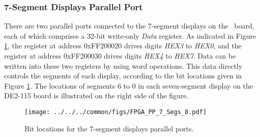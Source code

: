 \subsubsection{7-Segment Displays Parallel Port}

There are two parallel ports connected to the 7-segment displays on the \DEBoard~board, each of
which comprises a 32-bit write-only {\it Data} register. As indicated in 
Figure \ref{fig:segment_port}, the register at address {\sf 0xFF200020} 
drives digits {\it HEX3} to {\it HEX0}, and the register at 
address {\sf 0xFF200030} drives digits {\it HEX4} to
{\it HEX7}.  Data can be written into these two registers by using word operations. 
This data directly controls the segments of each display, according to
the bit locations given in Figure \ref{fig:segment_port}. The locations of segments 
6 to 0 in each seven-segment display on the DE2-115 board is illustrated on the right side of the
figure.

\begin{figure}[h!]
   \begin{center}
       \texttt{[image: ../../../common/figs/FPGA\_PP\_7\_Segs\_8.pdf]}
   \end{center}
   \caption{Bit locations for the 7-segment displays parallel ports.}
	\label{fig:segment_port}
\end{figure}